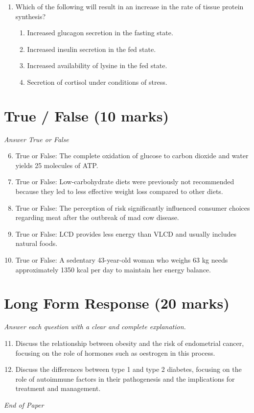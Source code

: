 \documentclass[12pt]{article}
\begin{document}
\begin{enumerate}[label=\arabic*.]
\begin{enumerate}[label=(\alph*)]
    \item Controlled animal studies provide more reliable information
    \item Reliable dose-response data are difficult to acquire and often unavailable
\end{enumerate}
\item Which of the following will result in an increase in the rate of tissue protein synthesis?
\begin{enumerate}[label=(\alph*)]
    \item Increased glucagon secretion in the fasting state.
    \item Increased insulin secretion in the fed state.
    \item Increased availability of lysine in the fed state.
    \item Secretion of cortisol under conditions of stress.
\end{enumerate}
\end{enumerate}

\section*{True / False (10 marks)}
\textit{Answer True or False}
\begin{enumerate}[label=\arabic*.]
\setcounter{enumi}{5}
\item True or False: The complete oxidation of glucose to carbon dioxide and water yields 25 molecules of ATP.
\item True or False: Low-carbohydrate diets were previously not recommended because they led to less effective weight loss compared to other diets.
\item True or False: The perception of risk significantly influenced consumer choices regarding meat after the outbreak of mad cow disease.
\item True or False: LCD provides less energy than VLCD and usually includes natural foods.
\item True or False: A sedentary 43-year-old woman who weighs 63 kg needs approximately 1350 kcal per day to maintain her energy balance.
\end{enumerate}

\section*{Long Form Response (20 marks)}
\textit{Answer each question with a clear and complete explanation.}
\begin{enumerate}[label=\arabic*.]
\setcounter{enumi}{10}
\item Discuss the relationship between obesity and the risk of endometrial cancer, focusing on the role of hormones such as oestrogen in this process.
\item Discuss the differences between type 1 and type 2 diabetes, focusing on the role of autoimmune factors in their pathogenesis and the implications for treatment and management.
\end{enumerate}

\vfill
\noindent\textit{End of Paper}
\end{document}
